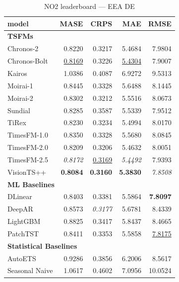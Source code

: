 \begin{table}[H]
\caption{NO2 leaderboard --- EEA DE}
\centering
\begin{small}
\begin{tabular}{lrrrr}
\toprule
model & MASE & CRPS & MAE & RMSE \\
\midrule
\multicolumn{5}{l}{\textbf{TSFMs}} \\
Chronos-2 & 0.8220 & 0.3217 & 5.4684 & 7.9804 \\
Chronos-Bolt & \underline{0.8169} & 0.3226 & \underline{5.4304} & 7.9007 \\
Kairos & 1.0386 & 0.4087 & 6.9272 & 9.5313 \\
Moirai-1 & 0.8445 & 0.3328 & 5.6488 & 8.1445 \\
Moirai-2 & 0.8302 & 0.3212 & 5.5516 & 8.0673 \\
Sundial & 0.8285 & 0.3587 & 5.5339 & 7.9512 \\
TiRex & 0.8230 & 0.3234 & 5.4994 & 8.0170 \\
TimesFM-1.0 & 0.8350 & 0.3328 & 5.5680 & 8.0845 \\
TimesFM-2.0 & 0.8209 & 0.3206 & 5.4632 & 8.0051 \\
TimesFM-2.5 & \textit{0.8172} & \underline{0.3169} & \textit{5.4492} & 7.9393 \\
VisionTS++ & \textbf{0.8084} & \textbf{0.3160} & \textbf{5.3830} & \textit{7.8508} \\
\midrule
\multicolumn{5}{l}{\textbf{ML Baselines}} \\
DLinear & 0.8403 & 0.3381 & 5.5864 & \textbf{7.8097} \\
DeepAR & 0.8573 & \textit{0.3177} & 5.6781 & 8.4339 \\
LightGBM & 0.8825 & 0.3417 & 5.8437 & 8.4665 \\
PatchTST & 0.8411 & 0.3353 & 5.5858 & \underline{7.8175} \\
\midrule
\multicolumn{5}{l}{\textbf{Statistical Baselines}} \\
AutoETS & 0.9286 & 0.3856 & 6.2006 & 8.5617 \\
Seasonal Naive & 1.0617 & 0.4602 & 7.0956 & 10.0524 \\
\bottomrule
\end{tabular}
\end{small}
\end{table}